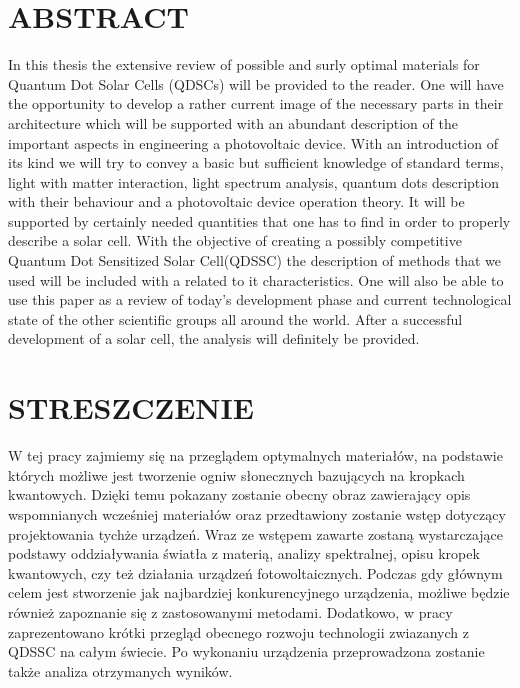 \documentclass[12pt,twoside]{report}
\numberwithin{equation}{subsection}
\begin{document}
\graphicspath{ {images/} }

\newpage

\begingroup

\let\clearpage\relax
\chapter*{\textbf{ABSTRACT}}

In this thesis the extensive review of possible and surly optimal materials for Quantum Dot Solar Cells (QDSCs) will be provided to the reader. One will have the opportunity to develop a rather current image of the necessary parts in their architecture which will be supported with an abundant description of the important aspects in engineering a photovoltaic device. With an introduction of its kind we will try to convey a basic but sufficient knowledge of standard terms, light with matter interaction, light spectrum analysis, quantum dots description with their behaviour and a photovoltaic device operation theory. It will be supported by certainly needed quantities that one has to find in order to properly describe a solar cell. With the objective of creating a possibly competitive Quantum Dot Sensitized Solar Cell(QDSSC) the description of methods that we used will be included with a related to it characteristics. One will also be able to use this paper as a review of today's development phase and current technological state of the other scientific groups all around the world.  After a successful development of a solar cell, the analysis will definitely be provided.

\chapter*{STRESZCZENIE}

W tej pracy zajmiemy się na przeglądem optymalnych materiałów, na podstawie których możliwe jest tworzenie ogniw słonecznych bazujących na kropkach kwantowych. Dzięki temu pokazany zostanie obecny obraz zawierający opis wspomnianych wcześniej materiałów oraz przedtawiony zostanie wstęp dotyczący projektowania tychże urządzeń. Wraz ze wstępem zawarte zostaną wystarczające podstawy oddziaływania światła z materią, analizy spektralnej, opisu kropek kwantowych, czy też działania urządzeń fotowoltaicznych. Podczas gdy głównym celem jest stworzenie jak najbardziej konkurencyjnego urządzenia, możliwe będzie również zapoznanie się z zastosowanymi metodami. Dodatkowo, w pracy zaprezentowano krótki przegląd obecnego rozwoju technologii zwiazanych z QDSSC na całym świecie. Po wykonaniu urządzenia przeprowadzona zostanie także analiza otrzymanych wyników.
\end{document}
